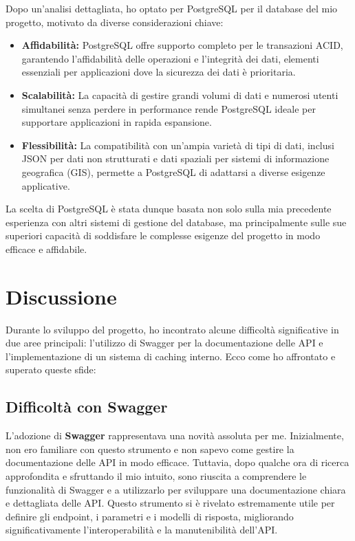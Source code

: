 \documentclass[12pt]{article}
\begin{document}
Dopo un'analisi dettagliata, ho optato per PostgreSQL per il database del mio progetto, motivato da diverse considerazioni chiave:
\begin{itemize}
\item \textbf{Affidabilità:} PostgreSQL offre supporto completo per le transazioni ACID, garantendo l'affidabilità delle operazioni e l'integrità dei dati, elementi essenziali per applicazioni dove la sicurezza dei dati è prioritaria.
\item \textbf{Scalabilità:} La capacità di gestire grandi volumi di dati e numerosi utenti simultanei senza perdere in performance rende PostgreSQL ideale per supportare applicazioni in rapida espansione.
\item \textbf{Flessibilità:} La compatibilità con un'ampia varietà di tipi di dati, inclusi JSON per dati non strutturati e dati spaziali per sistemi di informazione geografica (GIS), permette a PostgreSQL di adattarsi a diverse esigenze applicative.

\end{itemize}

La scelta di PostgreSQL è stata dunque basata non solo sulla mia precedente esperienza con altri sistemi di gestione del database, ma principalmente sulle sue superiori capacità di soddisfare le complesse esigenze del progetto in modo efficace e affidabile.


\section{Discussione}
Durante lo sviluppo del progetto, ho incontrato alcune difficoltà significative in due aree principali: l'utilizzo di Swagger per la documentazione delle API e l'implementazione di un sistema di caching interno. Ecco come ho affrontato e superato queste sfide:

\subsection{Difficoltà con Swagger}
L'adozione di \textbf{Swagger} rappresentava una novità assoluta per me. Inizialmente, non ero familiare con questo strumento e non sapevo come gestire la documentazione delle API in modo efficace. Tuttavia, dopo qualche ora di ricerca approfondita e sfruttando il mio intuito, sono riuscita a comprendere le funzionalità di Swagger e a utilizzarlo per sviluppare una documentazione chiara e dettagliata delle API. Questo strumento si è rivelato estremamente utile per definire gli endpoint, i parametri e i modelli di risposta, migliorando significativamente l'interoperabilità e la manutenibilità dell'API.
\end{document}
